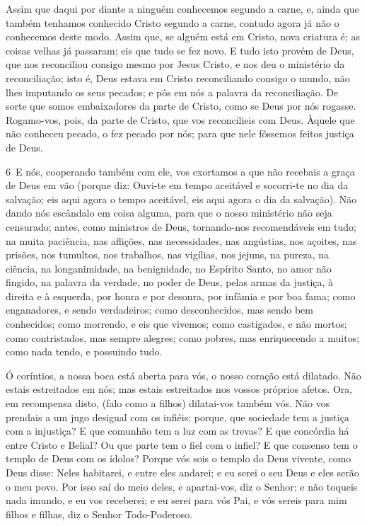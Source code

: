 Assim que daqui por diante a ninguém conhecemos segundo a carne,
e, ainda que também tenhamos conhecido Cristo segundo a carne,
contudo agora já não o conhecemos deste modo. Assim que, se
alguém está em Cristo, nova criatura é; as coisas velhas já
passaram; eis que tudo se fez novo. E tudo isto provém de
Deus, que nos reconciliou consigo mesmo por Jesus Cristo, e nos deu
o ministério da reconciliação; isto é, Deus estava em Cristo
reconciliando consigo o mundo, não lhes imputando os seus pecados; e
pôs em nós a palavra da reconciliação. De sorte que somos
embaixadores da parte de Cristo, como se Deus por nós rogasse.
Rogamo-vos, pois, da parte de Cristo, que vos reconcilieis com Deus.
Àquele que não conheceu pecado, o fez pecado por nós; para
que nele fôssemos feitos justiça de Deus.

\medskip

\lettrine{6}\ E nós, cooperando também com ele, vos exortamos a
que não recebais a graça de Deus em vão (porque diz: Ouvi-te em
tempo aceitável e socorri-te no dia da salvação; eis aqui agora o
tempo aceitável, eis aqui agora o dia da salvação). Não dando
nós escândalo em coisa alguma, para que o nosso ministério não seja
censurado; antes, como ministros de Deus, tornando-nos
recomendáveis em tudo; na muita paciência, nas aflições, nas
necessidades, nas angústias, nos açoites, nas prisões, nos
tumultos, nos trabalhos, nas vigílias, nos jejuns, na pureza, na
ciência, na longanimidade, na benignidade, no Espírito Santo, no
amor não fingido, na palavra da verdade, no poder de Deus, pelas
armas da justiça, à direita e à esquerda, por honra e por
desonra, por infâmia e por boa fama; como enganadores, e sendo
verdadeiros; como desconhecidos, mas sendo bem conhecidos; como
morrendo, e eis que vivemos; como castigados, e não mortos;
como contristados, mas sempre alegres; como pobres, mas
enriquecendo a muitos; como nada tendo, e possuindo tudo.

Ó coríntios, a nossa boca está aberta para vós, o nosso coração
está dilatado. Não estais estreitados em nós; mas estais
estreitados nos vossos próprios afetos. Ora, em recompensa
disto, (falo como a filhos) dilatai-vos também vós. Não vos
prendais a um jugo desigual com os infiéis; porque, que sociedade
tem a justiça com a injustiça? E que comunhão tem a luz com as
trevas? E que concórdia há entre Cristo e Belial? Ou que
parte tem o fiel com o infiel? E que consenso tem o templo de
Deus com os ídolos? Porque vós sois o templo do Deus vivente, como
Deus disse: Neles habitarei, e entre eles andarei; e eu serei o seu
Deus e eles serão o meu povo. Por isso saí do meio deles, e
apartai-vos, diz o Senhor; e não toqueis nada imundo, e eu vos
receberei; e eu serei para vós Pai, e vós sereis para mim
filhos e filhas, diz o Senhor Todo-Poderoso.

